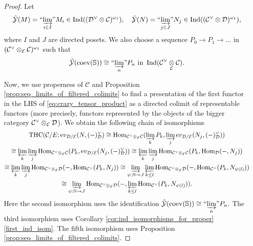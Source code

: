 \documentclass[11pt,leqno]{amsart}
\numberwithin{equation}{section}
\def\N{\mathbb{N}}
\def\bS{\mathbb{S}}
\def\Hom{\operatorname{Hom}}
\newcommand{\tens}[1]{%
  \mathbin{\mathop{\otimes}\displaylimits_{#1}}%
}
\newcommand{\indlim}[1][]{\mathop{\varinjlim}\limits_{#1}}
\newcommand{\inddlim}[1][]{{``{\indlim[#1]}"}}
\newcommand{\prolim}[1][]{\mathop{\varprojlim}\limits_{#1}}
\newcommand{\ev}{\mathrm ev}
\newcommand{\cD}{{\mathcal D}}
\newcommand{\cC}{{\mathcal C}}
\newcommand{\cE}{{\mathcal E}}
\newcommand{\cY}{{\mathcal Y}}
\newcommand{\THC}{\operatorname{THC}}
\newcommand{\Ind}{\operatorname{Ind}}
\newcommand{\coev}{\operatorname{coev}}
\begin{document}
\begin{proof} Let 
\begin{equation*}
\hat{\cY}(M)=\inddlim[i\in I] M_i\in \Ind((\cD^{\vee}\otimes\cC)^{\omega_1}),\quad \hat{\cY}(N)=\inddlim[j\in J] N_j\in \Ind((\cC^{\vee}\otimes\cD)^{\omega_1}),
\end{equation*} 
where $I$ and $J$ are directed posets. We also choose a sequence $P_0\to P_1\to\dots$ in $(\cC^{\vee}\tens{\cE}\cC)^{\omega_1}$ such that $$\hat{\cY}(\coev(\bS))\cong \inddlim[n] P_n\text{ in }\Ind(\cC^{\vee}\tens{\cE}\cC).$$ 

Now, we use properness of $\cC$ and Proposition \ref{prop:seq_limits_of_filtered_colimits} to find a presentation of the first functor in the LHS of \eqref{eq:crazy_tensor_product} as a directed colimit of representable functors (more precisely, functors represented by the objects of the bigger category $\cC^{\vee}\tens{\cE}\cD$). We obtain the following chain of isomorphisms
\begin{multline}\label{eq:presentation_as_colim_of_representables}
	\THC(\cC/E;\ev_{\cD/\cE}(N,(-)_{\cD}^{\vee})\cong \Hom_{\cC^{\vee}\tens{\cE}\cC}(\indlim[k] P_k,\indlim[j] \ev_{\cD/\cE}(N_j,(-)_{\cD}^{\vee}))\\
	\cong \prolim[k]\indlim[j] \Hom_{\cC^{\vee}\tens{\cE}\cC} (P_k,\ev_{\cD/\cE}(N_j,(-)_{\cD}^{\vee}))
	\cong \prolim[k]\indlim[j] \Hom_{\cC^{\vee}\tens{\cE}\cC} (P_k,\Hom_{\cD}(-,N_j))\\
	\cong \prolim[k]\indlim[j] \Hom_{\cC^{\vee}\tens{\cE}\cD}(-,\Hom_{\cC^{\vee}}(P_k,N_j))\cong \indlim[\psi:\N\to J] \prolim[k\leq l] \Hom_{\cC^{\vee}\tens{\cE}\cD}(-,\Hom_{\cC^{\vee}}(P_k,N_{\psi(l)}))\\
	\cong \indlim[\psi:\N\to J] \Hom_{\cC^{\vee}\tens{\cE}\cD}(-,\prolim[k\leq l] \Hom_{\cC^{\vee}}(P_k,N_{\psi(l)})).
\end{multline}
Here the second isomorphism uses the identification $\hat{\cY}(\coev(\bS))\cong\inddlim[n] P_n.$ The third isomorphism uses Corollary \ref{cor:ind_isomorphisms_for_proper} \ref{first_ind_isom}. The fifth isomorphism uses Proposition \ref{prop:seq_limits_of_filtered_colimits}.


\end{proof}
\end{document}
